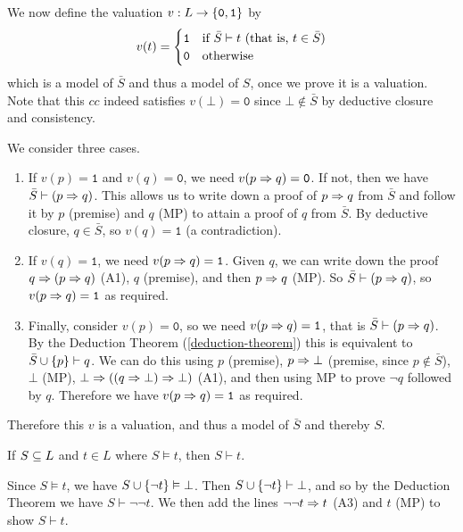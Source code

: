 \documentclass{article}
\begin{document}
\begin{prf}
	We now define the valuation $v: L \to \left\lbrace \texttt{0}, \texttt{1} \right\rbrace$ by 
	\[
	v(t) = \begin{cases}
		\texttt{1} & \text{if $\bar S \vdash t$ (that is, $t \in \bar S$)} \\
		\texttt{0} & \!\mathrel{\, \text{otherwise}}
	\end{cases}
	\]
	which is a model of $\bar S$ and thus a model of $S$, once we prove it is a valuation. Note that this $cc$ indeed satisfies $v(\bot) = \texttt{0}$ since $\bot \notin \bar S$ by deductive closure and consistency.
	
	We consider three cases.
	\begin{enumerate}
    	\item If $v(p) = \texttt{1}$ and $v(q) = \texttt{0}$, we need $v(p \Rightarrow q) = \texttt{0}$. If not, then we have $\bar S \vdash (p \Rightarrow q)$. This allows us to write down a proof of $p \Rightarrow q$ from $\bar S$ and follow it by $p$ (premise) and $q$ (MP) to attain a proof of $q$ from $\bar S$. By deductive closure, $q \in \bar S$, so $v(q) = \texttt{1}$ (a contradiction).
    	\item If $v(q) = \texttt{1}$, we need $v(p \Rightarrow q) = \texttt{1}$. Given $q$, we can write down the proof $q \Rightarrow (p \Rightarrow q)$ (A1), $q$ (premise), and then $p \Rightarrow q$ (MP). So $\bar S \vdash (p \Rightarrow q)$, so $v(p \Rightarrow q) = \texttt{1}$ as required.
    	\item Finally, consider $v(p) = \texttt{0}$, so we need $v(p \Rightarrow q) = \texttt{1}$, that is $\bar S \vdash (p \Rightarrow q)$. By the Deduction Theorem (\ref{deduction-theorem}) this is equivalent to $\bar S \cup \left\lbrace p \right\rbrace \vdash q$. We can do this using $p$ (premise), $p \Rightarrow \bot$ (premise, since $p \notin \bar S$), $\bot$ (MP), $\bot \Rightarrow ((q \Rightarrow \bot) \Rightarrow \bot)$ (A1), and then using MP to prove $\lnot q$ followed by $q$. Therefore we have $v(p \Rightarrow q) = \texttt{1}$ as required.
	\end{enumerate}
	Therefore this $v$ is a valuation, and thus a model of $\bar S$ and thereby $S$.
\end{prf}

\begin{theorem}
	\label{adequacy-theorem}
	If $S \subseteq L$ and $t \in L$ where $S \vDash t$, then $S \vdash t$.
\end{theorem}

\begin{prf}
    Since $S \vDash t$, we have $S \cup \left\lbrace \lnot t \right\rbrace \vDash \bot$. Then $S \cup \left\lbrace \lnot t \right\rbrace \vdash \bot$, and so by the Deduction Theorem we have $S \vdash \lnot \lnot t$. We then add the lines $\lnot \lnot t \Rightarrow t$ (A3) and $t$ (MP) to show $S \vdash t$.
\end{prf}
\end{document}

